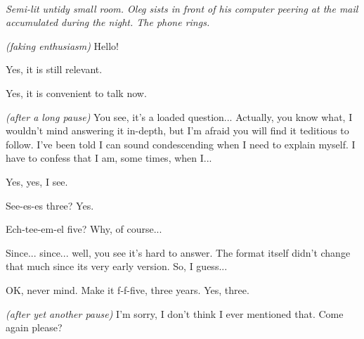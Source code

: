 \documentclass[11pt,a4paper,oneside]{memoir}
\begin{document}
\begin{description}[itemsep=1ex,leftmargin=1cm]

\item[] \hfill \\
  \textit{Semi-lit untidy small room. Oleg sists in front of his
    computer peering at the mail accumulated during the night. The phone
    rings.}


\item[Oleg] \textit{(faking enthusiasm)} Hello!

\item[Oleg] Yes, it is still relevant.

\item[Oleg] Yes, it is convenient to talk now.

\item[Oleg] \textit{(after a long pause)} You see, it's a loaded
  question... Actually, you know what, I wouldn't mind answering it
  in-depth, but I'm afraid you will find it teditious to follow.
  I've been told I can sound condescending when I need to explain
  myself. I have to confess that I am, some times, when I...

\item[Oleg] Yes, yes, I see.

\item[Oleg] See-es-es three? Yes.

\item[Oleg] Ech-tee-em-el five? Why, of course...

\item[Oleg] Since... since... well, you see it's hard to answer. The
  format itself didn't change that much since its very early version.
  So, I guess...

\item[Oleg] OK, never mind. Make it f-f-five, three years. Yes, three.

\item[Oleg] \textit{(after yet another pause)} I'm sorry, I don't
  think I ever mentioned that. Come again please?


\end{description}
\end{document}
